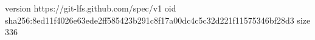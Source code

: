 version https://git-lfs.github.com/spec/v1
oid sha256:8ed11f4026e63ede2ff585423b291c8f17a00dc4c5c32d221f11575346bf28d3
size 336
